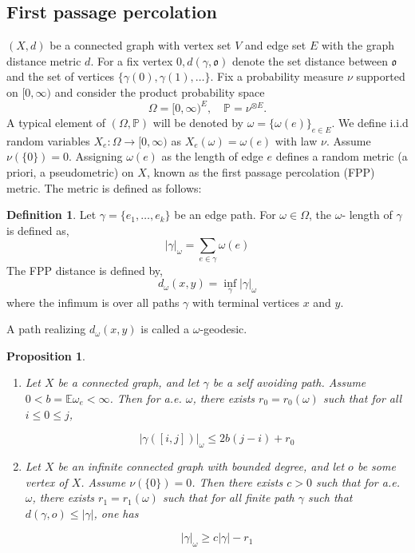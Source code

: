 \documentclass[12 pt]{amsart}
\newtheorem{proposition}[theorem]{Proposition}
\theoremstyle{definition}
\newtheorem{definition}[theorem]{Definition}
\theoremstyle{remark}
\begin{document}



\subsection{First passage percolation} \label{sec23}
 $(X,d)$ be a connected graph with vertex set $V$ and edge set $E$ with the graph distance metric $d$. For a fix vertex $\mathfrak{0}, d(\gamma, \mathfrak{o})$ denote the set distance between $\mathfrak{o}$ and the set of vertices $\{\gamma(0), \gamma(1), \ldots\}$. \newline 
 Fix a probability measure $\nu$ supported on  $[0, \infty)$ and consider the product probability space
\[
\Omega = [0, \infty)^E, \quad \mathbb{P} = \nu^{\otimes E}.
\]
A typical element of $(\Omega, \mathbb{P})$ will be denoted by $\omega = \{\omega(e)\}_{e\in E}$. We define i.i.d random variables $X_e:\Omega \rightarrow [0, \infty)$ as $ X_e(\omega) = \omega(e) $ with law $\nu$. Assume $\nu(\{0\})=0.$
Assigning  $\omega(e)$ as the length of edge $e$ defines a random metric (a priori, a pseudometric) on $X$, known as the first passage percolation (FPP) metric. The metric is defined as follows:
\begin{definition}

Let $\gamma = \{e_1, \dots, e_k\}$ be an edge path. For $\omega \in \Omega$, the $\omega$- length of $\gamma$ is defined as, 
\[
|\gamma|_{\omega}  = \sum_{e \in \gamma} \omega(e)
\]
The FPP distance is defined by, 
\[
d_\omega(x, y) = \inf_\gamma |\gamma|_\omega
\]
where the infimum is over all paths $\gamma$ with terminal vertices $x$ and $y$.
    
\end{definition}
A path realizing $d_\omega(x, y)$ is called a \emph{\( \omega \)}-geodesic. 
\begin{proposition}\label{prop2.13}     \cite[Lemma 2.3, Lemma 2.5]{BT17} 
\begin{enumerate}
\item Let $X$ be a connected graph, and let $\gamma$ be a self avoiding path. Assume $0<b=\mathbb{E} \omega_{e}<\infty$. Then for a.e. $\omega$, there exists $r_{0}=r_{0}(\omega)$ such that for all $i \leq 0 \leq j$,

$$
|\gamma([i, j])|_{\omega} \leq 2 b(j-i)+r_{0}
$$
\item \label{extension} Let $X$ be an infinite connected graph with bounded degree, and let $o$ be some vertex of $X$. Assume $\nu(\{0\})=0$. Then there exists $c>0$ such that for a.e. $\omega$, there exists $r_{1}=r_{1}(\omega)$ such that for all finite path $\gamma$ such that $d(\gamma, o) \leq |\gamma|$, one has

\[|\gamma|_{\omega} \geq c|\gamma|-r_{1}\]
\end{enumerate}
\end{proposition}
\end{document}
